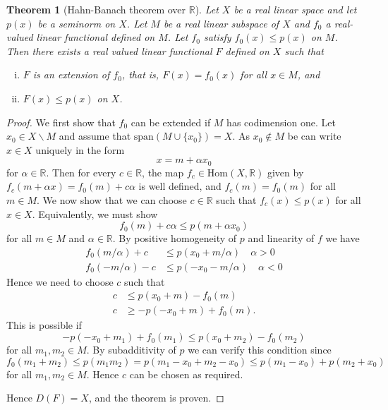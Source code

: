 \documentclass[10pt, oneside, reqno]{amsbook}
\theoremstyle{plain}%
\newtheorem{thm}{Theorem}[section]
\theoremstyle{definition}
\theoremstyle{remark}
\newcommand{\R}{\mathbb{R}}
\begin{document}

% 

\begin{thm}[Hahn-Banach theorem over $\R$]
    Let $X$ be a real linear space and let $p(x)$ be a seminorm on $X$.  Let $M$ be a real linear subspace of $X$ and $f_0$ a real-valued linear functional defined on $M$.  Let $f_0$ satisfy $f_0(x) \leq p(x)$ on $M$.  Then there exists a real valued linear functional $F$ defined on $X$ such that 
    \begin{enumerate}[(i)]
        \item $F$ is an extension of $f_0$, that is, $F(x) = f_0(x)$ for all $x \in M$, and 
        \item $F(x) \leq p(x)$ on $X$.  
    \end{enumerate}
\end{thm}

\begin{proof}
    We first show that $f_0$ can be extended if $M$ has codimension one.  Let $x_0 \in X \backslash M$ and assume that $\text{span}(M \cup \{ x_0 \}) = X$. As $x_0 \notin M$ be can write $x \in X$ uniquely in the form \[
        x = m + \alpha x_0
    \] for $\alpha \in \R$.  Then for every $c \in \R$, the map $f_c \in \text{Hom}(X, \R)$ given by $f_c(m + \alpha x) = f_0(m) + c \alpha$ is well defined, and $f_c(m) = f_0(m)$ for all $m \in M$. We now show that we can choose $c \in \R$ such that $f_c(x) \leq p(x)$ for all $ x \in X$.  Equivalently, we must show 
    \[
        f_0(m) + c \alpha \leq p(m + \alpha x_0)
    \] for all $m \in M$ and $\alpha \in \R$.  By positive homogeneity of $p$ and linearity of $f$ we have \begin{align*}
        f_0(m / \alpha) + c &\leq p(x_0 + m/\alpha) \quad \alpha > 0 \\
        f_0(-m/\alpha) - c &\leq p(-x_0 -m/\alpha) \quad \alpha < 0
    \end{align*}  Hence we need to choose $c$ such that \begin{align*}
        c &\leq p(x_0 + m) - f_0(m) \\
        c &\geq -p(-x_0 + m) + f_0(m).
    \end{align*}  This is possible if \[
        -p(-x_0 + m_1) + f_0(m_1) \leq p(x_0 + m_2) - f_0(m_2) 
    \] for all $m_1, m_2 \in M$.  By subadditivity of $p$ we can verify this condition since \[
        f_0(m_1 + m_2) \leq p(m_1 m_2) = p(m_1 - x_0 + m_2 - x_0) \leq p(m_1 - x_0) + p(m_2 + x_0)
    \] for all $m_1, m_2 \in M$.  Hence $c$ can be chosen as required.
    
    
    Hence $D(F) = X$, and the theorem is proven.
\end{proof}
\end{document}
